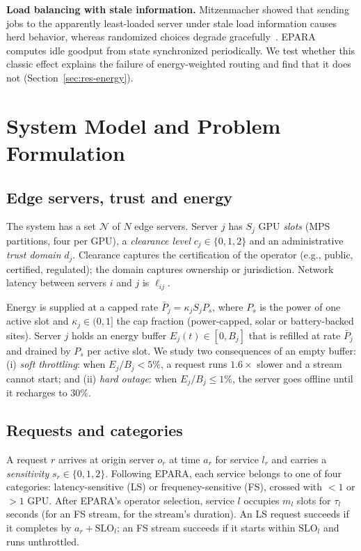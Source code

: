 \documentclass[journal]{IEEEtran}
\begin{document}
\textbf{Load balancing with stale information.}
Mitzenmacher showed that sending jobs to the apparently least-loaded server under stale load information causes herd behavior, whereas randomized choices degrade gracefully~\cite{mitzenmacher2000old,mitzenmacher2001two}. EPARA computes idle goodput from state synchronized periodically. We test whether this classic effect explains the failure of energy-weighted routing and find that it does not (Section~\ref{sec:res-energy}).

\section{System Model and Problem Formulation}\label{sec:model}

\subsection{Edge servers, trust and energy}
The system has a set $\mathcal{N}$ of $N$ edge servers. Server $j$ has $S_j$ GPU \emph{slots} (MPS partitions, four per GPU), a \emph{clearance level} $c_j\in\{0,1,2\}$ and an administrative \emph{trust domain} $d_j$. Clearance captures the certification of the operator (e.g., public, certified, regulated); the domain captures ownership or jurisdiction. Network latency between servers $i$ and $j$ is $\ell_{ij}$.

Energy is supplied at a capped rate $\bar P_j=\kappa_j S_j P_s$, where $P_s$ is the power of one active slot and $\kappa_j\in(0,1]$ the cap fraction (power-capped, solar or battery-backed sites). Server $j$ holds an energy buffer $E_j(t)\in[0,B_j]$ that is refilled at rate $\bar P_j$ and drained by $P_s$ per active slot. We study two consequences of an empty buffer:
(i) \emph{soft throttling}: when $E_j/B_j<5\%$, a request runs $1.6\times$ slower and a stream cannot start; and
(ii) \emph{hard outage}: when $E_j/B_j\le1\%$, the server goes offline until it recharges to $30\%$.

\subsection{Requests and categories}
A request $r$ arrives at origin server $o_r$ at time $a_r$ for service $l_r$ and carries a \emph{sensitivity} $s_r\in\{0,1,2\}$. Following EPARA, each service belongs to one of four categories: latency-sensitive (LS) or frequency-sensitive (FS), crossed with $<1$ or $>1$ GPU. After EPARA's operator selection, service $l$ occupies $m_l$ slots for $\tau_l$ seconds (for an FS stream, for the stream's duration). An LS request succeeds if it completes by $a_r+\mathrm{SLO}_l$; an FS stream succeeds if it starts within $\mathrm{SLO}_l$ and runs unthrottled.
\end{document}
